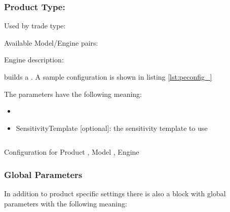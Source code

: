 
\subsubsection{Product Type: }

Used by trade type:

Available Model/Engine pairs:

Engine description:

 builds a . A sample configuration is shown in listing \ref{lst:peconfig_}

The parameters have the following meaning:

\begin{itemize}
\item 
\item SensitivityTemplate [optional]: the sensitivity template to use 
\end{itemize}

\begin{longlisting}
\begin{verbatim}

\end{verbatim}
\caption{Configuration for Product , Model , Engine }
\label{lst:peconfig_}
\end{longlisting}



\subsubsection{Global Parameters}

In addition to product specific settings there is also a block with global parameters with the following meaning:

